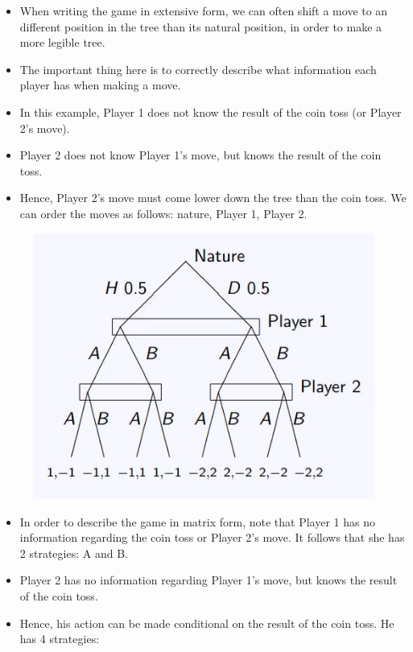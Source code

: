 \documentclass[]{report}
\begin{document}
\begin{itemize}
	\item When writing the game in extensive form, we can often shift a
	move to an different position in the tree than its natural position,
	in order to make a more legible tree.
	\item	The important thing here is to correctly describe what information
	each player has when making a move.
	\item In this example, Player 1 does not know the result of the coin toss
	(or Player 2’s move).
	\item	Player 2 does not know Player 1’s move, but knows the result of
	the coin toss. 
	\item Hence, Player 2’s move must come lower down the
	tree than the coin toss. We can order the moves as follows:
	nature, Player 1, Player 2.
\end{itemize}


\begin{figure}
\centering
\includegraphics[width=0.55\linewidth]{images/DR5-Slide25}
\caption{}
\label{fig:DR5-Slide25}
\end{figure}

\begin{itemize}
	\item In order to describe the game in matrix form, note that Player 1
	has no information regarding the coin toss or Player 2’s move. It
	follows that she has 2 strategies: A and B.
\item	Player 2 has no information regarding Player 1’s move, but knows
	the result of the coin toss. 
\item Hence, his action can be made
	conditional on the result of the coin toss. He has 4 strategies:
\end{itemize}
\end{document}
